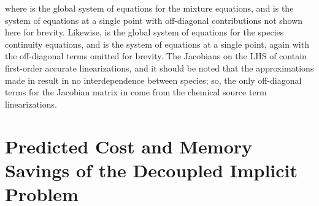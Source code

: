 where  is the global system of equations for the
mixture equations, and  is the system of equations at a single
point with off-diagonal contributions not shown here for brevity.  Likewise,
 is the global system of equations for the species
continuity equations, and  is the system of equations at a
single point, again with the off-diagonal terms omitted for brevity. The
Jacobians on the LHS of  contain
first-order accurate linearizations, and it should be noted that the
approximations made in  result in no interdependence between
species; so, the only off-diagonal terms for the Jacobian matrix in
 come from the chemical source term linearizations.

\section{Predicted Cost and Memory Savings of the Decoupled Implicit Problem}
\label{sec:predicted-cost-mem-savings}

